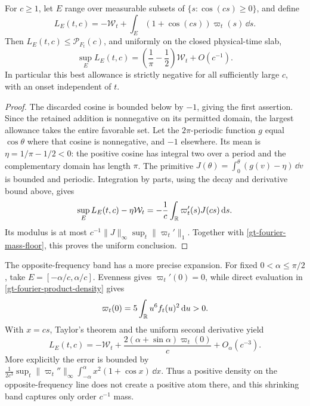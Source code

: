 \begin{theorem}
\label{gt-favorable-phase-theorem}
For \(c\ge1\), let \(E\) range over measurable subsets of
\(\{s:\cos(cs)\ge0\}\), and define
\[
 L_E(t,c)=-\mathcal W_t+
       \int_E(1+\cos(cs))\varpi_t(s)\,\dd s.
\]
Then \(L_E(t,c)\le\mathcal P_{F_t}(c)\), and uniformly on the closed
physical-time slab,
\begin{equation}
 \sup_E L_E(t,c)
 =\left(\frac1\pi-\frac12\right)\mathcal W_t+O(c^{-1}).
 \label{gt-optimal-phase-limit}
\end{equation}
In particular this best allowance is strictly negative for all
sufficiently large \(c\), with an onset independent of \(t\).
\end{theorem}
\begin{proof}
The discarded cosine is bounded below by \(-1\), giving the first
assertion. Since the retained addition is nonnegative on its permitted
domain, the largest allowance takes the entire favorable set. Let the
\(2\pi\)-periodic function \(g\) equal \(\cos\theta\) where that cosine
is nonnegative, and \(-1\) elsewhere. Its mean is
\(\eta=1/\pi-1/2<0\): the positive cosine has integral two over a
period and the complementary domain has length \(\pi\).
The primitive
\(J(\theta)=\int_0^\theta(g(v)-\eta)\,\dd v\) is bounded and periodic.
Integration by parts, using the decay and derivative bound above, gives
\[
 \sup_E L_E(t,c)-\eta\mathcal W_t
 =-\frac1c\int_\mathbb R\varpi_t'(s)J(cs)\,\mathrm d s.
\]
Its modulus is at most
\(c^{-1}\|J\|_\infty\sup_t\|\varpi_t'\|_1\). Together with
\eqref{gt-fourier-mass-floor}, this proves the uniform conclusion.
\end{proof}

The opposite-frequency band has a more precise expansion. For fixed
\(0<\alpha\le\pi/2\), take \(E=[-\alpha/c,\alpha/c]\). Evenness gives
\(\varpi_t'(0)=0\), while direct evaluation in
\eqref{gt-fourier-product-density} gives
\[
 \varpi_t(0)=5\int_\mathbb R u^6 f_t(u)^2\,\mathrm d u>0.
\]
With \(x=cs\), Taylor's theorem and the uniform second derivative yield
\begin{equation}
 L_E(t,c)=-\mathcal W_t+
   \frac{2(\alpha+\sin\alpha)\varpi_t(0)}{c}+O_\alpha(c^{-3}).
 \label{gt-antidiagonal-band}
\end{equation}
More explicitly the error is bounded by
\(\frac{1}{2c^3}\sup_t\|\varpi_t''\|_\infty
\int_{-\alpha}^{\alpha}x^2(1+\cos x)\,\dd x\).
Thus a positive density on the opposite-frequency line does not create
a positive atom there, and this shrinking band captures only order
\(c^{-1}\) mass.

